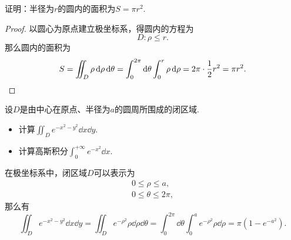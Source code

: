 \begin{example}
证明：半径为\(r\)的圆内的面积为\(S = \pi r^2\).
\begin{proof}
以圆心为原点建立极坐标系，得圆内的方程为\begin{equation*}
	D: \rho \leq r.
\end{equation*}
那么圆内的面积为\begin{equation*}
	S = \iint_D \rho \dd{\rho} \dd{\theta}
	= \int_0^{2\pi} \dd{\theta} \int_0^r \rho \dd{\rho}
	= 2\pi \cdot \frac{1}{2} r^2
	= \pi r^2.
	\qedhere
\end{equation*}
\end{proof}
\end{example}

\begin{example}\label{example:二重积分.利用二重积分计算高斯积分}
设\(D\)是由中心在原点、半径为\(a\)的圆周所围成的闭区域.
\begin{itemize}
	\item 计算\(\iint_D e^{-x^2-y^2} \dd{x} \dd{y}\).
	\item 计算高斯积分\(\int_0^{+\infty} e^{-x^2} \dd{x}\).
\end{itemize}
\begin{solution}
在极坐标系中，闭区域\(D\)可以表示为\begin{gather*}
	0 \leq \rho \leq a, \\
	0 \leq \theta \leq 2\pi,
\end{gather*}
那么有\begin{equation*}
	\iint_D e^{-x^2-y^2} \dd{x} \dd{y}
	= \iint_D e^{-\rho^2} \rho \dd{\rho} \dd{\theta}
	= \int_0^{2\pi} \dd{\theta} \int_0^a e^{-\rho^2} \rho \dd{\rho}
	= \pi(1-e^{-a^2}).
\end{equation*}


\end{solution}
\end{example}
